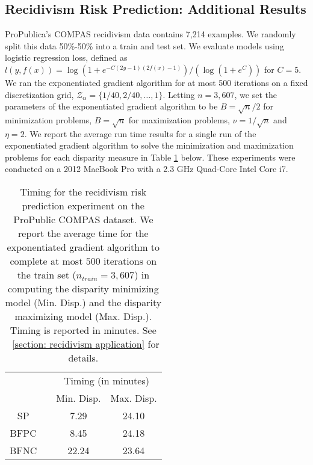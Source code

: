 \documentclass{article}
\begin{document}
\subsection{Recidivism Risk Prediction: Additional Results}\label{section: recidivism additional results}

ProPublica's COMPAS recidivism data \cite{AngwinEtAl(16)} contains 7,214 examples. We randomly split this data 50\%-50\% into a train and test set. We evaluate models using logistic regression loss, defined as $l(y, f(x)) = \log(1 + e^{-C(2y-1)(2 f(x) - 1)})/(\log(1 + e^C))$ for $C = 5$. We ran the exponentiated gradient algorithm for at most 500 iterations on a fixed discretization grid, $\mathcal{Z}_\alpha = \{1/40, 2/40,\hdots, 1\}$. Letting $n = 3,607$, we set the parameters of the exponentiated gradient algorithm to be $B = \sqrt{n}/2$ for minimization problems, $B = \sqrt{n}$ for maximization problems, $\nu = 1/\sqrt{n}$ and $\eta = 2$. We report the average run time results for a single run of the exponentiated gradient algorithm to solve the minimization and maximization problems for each disparity measure in Table \ref{table: Compas Race - Traing Timing} below. These experiments were conducted on a 2012 MacBook Pro with a 2.3 GHz Quad-Core Intel Core i7.

\begin{table}[t]
\caption{Timing for the recidivism risk prediction experiment on the ProPublic COMPAS dataset. We report the average time for the exponentiated gradient algorithm to complete at most $500$ iterations on the train set ($n_{train} = 3,607$) in computing the disparity minimizing model (Min. Disp.) and the disparity maximizing model (Max. Disp.). Timing is reported in minutes. See \textsection~\ref{section: recidivism application} for details.}
\label{table: Compas Race - Traing Timing}
\vskip 0.15in
\begin{center}
\begin{small}
\begin{sc}
\begin{tabular}{c c c c }
\toprule
& & \multicolumn{2}{c}{Timing (in minutes)} \\
& & Min. Disp.  & Max. Disp. \\
\midrule
SP & & 7.29 & 24.10 \\
BFPC & & 8.45 & 24.18 \\
BFNC & & 22.24 & 23.64 \\
\bottomrule
\end{tabular}
\end{sc}
\end{small}
\end{center}
\vskip -0.1in
\end{table}
\end{document}
